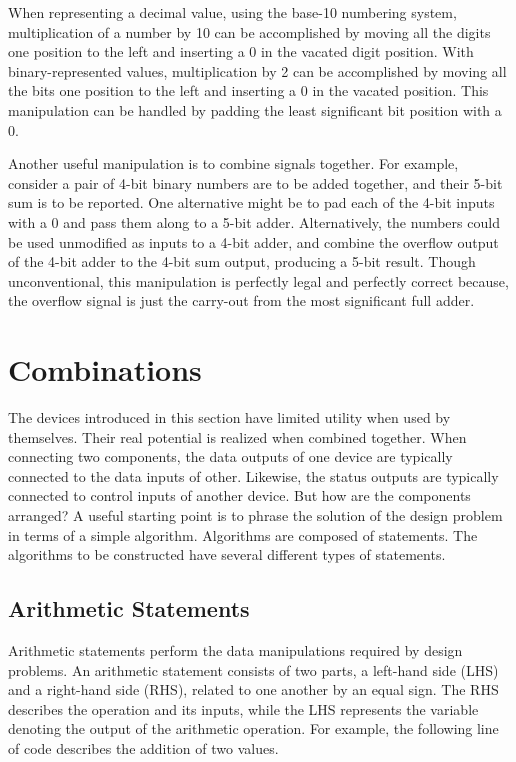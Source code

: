 When representing a decimal value, using the base-10 numbering system, 
multiplication of a 
number by 10 can be accomplished by moving all the digits
one position to the left and inserting a 0 in the vacated
digit position.  With binary-represented values,
multiplication by 2 can be accomplished by moving all the
bits one position to the left and inserting a 0 in the 
vacated position.  This manipulation can be handled by padding the least
significant bit position with a 0.

Another useful manipulation is to combine signals together.  For 
example, consider a pair of 4-bit binary numbers
are to be added together, and their 5-bit sum is to be reported.
One alternative might be to pad each of the 4-bit inputs with a 0 and 
pass them along to a 5-bit adder.  Alternatively, 
the numbers could be used unmodified as inputs to a 4-bit adder, 
and combine the overflow output
of the 4-bit adder to the 4-bit sum output, producing a 5-bit result.
Though unconventional, this manipulation is perfectly legal and perfectly 
correct because, the overflow signal is just the 
carry-out from the most significant full adder.


\section{Combinations}
The devices introduced in this section have limited utility when
used by themselves. Their real potential is realized when combined together. 
When connecting two components, the data 
outputs of one device are typically connected to the data inputs 
of other.  Likewise, the status outputs are typically connected 
to control inputs of another device.  But how are the components arranged? 
A useful starting point is to phrase the solution 
of the design problem in terms of a simple algorithm.  Algorithms 
are composed of statements. The algorithms to be constructed 
have several different types of statements.

\subsection{Arithmetic Statements}
Arithmetic statements perform the data manipulations required by
design problems.  An arithmetic statement consists of two parts,
a left-hand side (LHS) and a right-hand side (RHS), related to one
another by an equal sign.  The RHS describes the operation and its
inputs, while the LHS represents the variable denoting the output 
of the arithmetic operation.  For example, the following line of
code describes the addition of two values.


